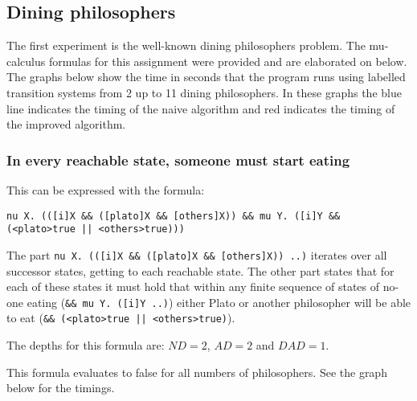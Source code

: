 \documentclass[10pt,a4paper]{article}
\begin{document}
\subsection{Dining philosophers}
The first experiment is the well-known dining philosophers problem. The mu-calculus formulas for this assignment were provided and are elaborated on below.\\
The graphs below show the time in seconds that the program runs using labelled transition systems from 2 up to 11 dining philosophers. In these graphs the blue line indicates the timing of the naive algorithm and red indicates the timing of the improved algorithm.

\subsubsection{In every reachable state, someone must start eating}
This can be expressed with the formula:

\begin{center}
	\tt nu X. (([i]X \&\& ([plato]X \&\& [others]X)) \&\& mu Y. ([i]Y \&\& (<plato>true || <others>true)))
\end{center}	
	
The part {\tt nu X. (([i]X \&\& ([plato]X \&\& [others]X)) ..)} iterates over all successor states, getting to each reachable state. The other part states that for each of these states it must hold that within any finite sequence of states of no-one eating ({\tt \&\& mu Y. ([i]Y ..)}) either Plato or another philosopher will be able to eat ({\tt \&\& (<plato>true || <others>true)}).

The depths for this formula are: $ND = 2$, $AD = 2$ and $DAD = 1$.

This formula evaluates to false for all numbers of philosophers. See the graph below for the timings.

\end{document}
